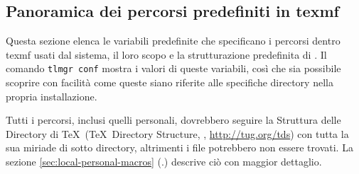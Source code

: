 \documentclass{article}
\begin{document}
\subsection{Panoramica dei percorsi predefiniti in texmf}
\label{sec:texmftrees}

Questa sezione elenca le variabili predefinite che specificano i percorsi
dentro texmf usati dal sistema, il loro scopo e la strutturazione
predefinita di \TL{}. Il comando \texttt{tlmgr~conf} mostra i valori di
queste variabili, così che sia possibile scoprire con facilità come queste
siano riferite alle specifiche directory nella propria installazione.

Tutti i percorsi, inclusi quelli personali, dovrebbero seguire la Struttura
delle Directory di \TeX\ (\TeX\ Directory Structure, \TDS,
\url{http://tug.org/tds}) con tutta la sua miriade di sotto directory,
altrimenti i file potrebbero non essere trovati. La sezione
\ref{sec:local-personal-macros} (\p.\pageref{sec:local-personal-macros})
descrive ciò con maggior dettaglio.
\end{document}
